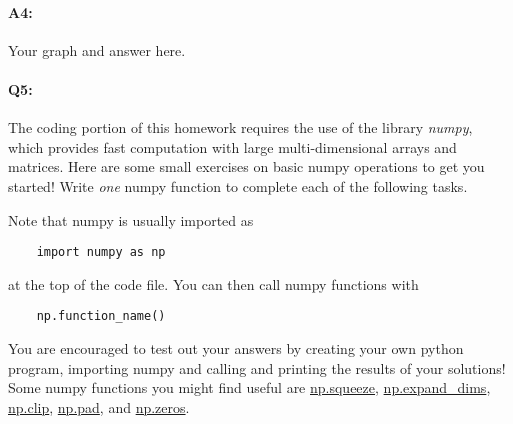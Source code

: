 \pagebreak
\paragraph{A4:} Your graph and answer here.





\pagebreak 
\paragraph{Q5:} The coding portion of this homework requires the use of the library \emph{numpy}, which provides fast computation with large multi-dimensional arrays and matrices. Here are some small exercises on basic numpy operations to get you started! Write \emph{one} numpy function to complete each of the following tasks.

Note that numpy is usually imported as
\begin{verbatim}
    import numpy as np
\end{verbatim}
at the top of the code file. You can then call numpy functions with \begin{verbatim}
    np.function_name()
\end{verbatim}
You are encouraged to test out your answers by creating your own python program, importing numpy and calling and printing the results of your solutions! Some numpy functions you might find useful are \href{https://numpy.org/doc/stable/reference/generated/numpy.squeeze.html}{np.squeeze}, \href{https://numpy.org/doc/stable/reference/generated/numpy.expand_dims.html}{np.expand\_dims}, \href{https://numpy.org/doc/stable/reference/generated/numpy.clip.html}{np.clip}, \href{https://numpy.org/doc/stable/reference/generated/numpy.pad.html}{np.pad}, and \href{https://numpy.org/doc/stable/reference/generated/numpy.zeros.html}{np.zeros}.

